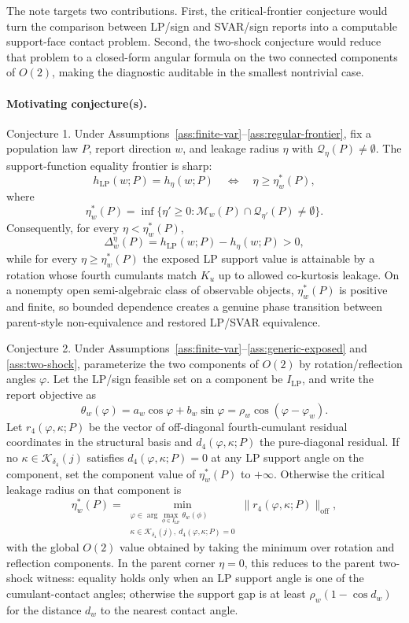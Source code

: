 \documentclass[11pt]{article}
\theoremstyle{definition}
\theoremstyle{plain}
\theoremstyle{remark}
\begin{document}
The note targets two contributions.  First, the critical-frontier conjecture would turn the comparison between LP/sign and SVAR/sign reports into a computable support-face contact problem.  Second, the two-shock conjecture would reduce that problem to a closed-form angular formula on the two connected components of \(O(2)\), making the diagnostic auditable in the smallest nontrivial case.

\paragraph{Motivating conjecture(s).}
Conjecture 1. Under Assumptions~\ref{ass:finite-var}--\ref{ass:regular-frontier}, fix a population law \(P\), report direction \(w\), and leakage radius \(\eta\) with \(\mathcal Q_\eta(P)\ne\emptyset\).  The support-function equality frontier is sharp:
\[
h_{\mathrm{LP}}(w;P)=h_\eta(w;P)
\quad\Longleftrightarrow\quad
\eta\ge \eta_w^*(P),
\]
where
\[
\eta_w^*(P)=
\inf\{\eta'\ge0:\mathcal M_w(P)\cap\mathcal Q_{\eta'}(P)\ne\emptyset\}.
\]
Consequently, for every \(\eta<\eta_w^*(P)\),
\[
\Delta_w^\eta(P)=h_{\mathrm{LP}}(w;P)-h_\eta(w;P)>0,
\]
while for every \(\eta\ge\eta_w^*(P)\) the exposed LP support value is attainable by a rotation whose fourth cumulants match \(K_u\) up to allowed co-kurtosis leakage.  On a nonempty open semi-algebraic class of observable objects, \(\eta_w^*(P)\) is positive and finite, so bounded dependence creates a genuine phase transition between parent-style non-equivalence and restored LP/SVAR equivalence.

Conjecture 2. Under Assumptions~\ref{ass:finite-var}--\ref{ass:generic-exposed} and \ref{ass:two-shock}, parameterize the two components of \(O(2)\) by rotation/reflection angles \(\varphi\).  Let the LP/sign feasible set on a component be \(I_{\mathrm{LP}}\), and write the report objective as
\[
\theta_w(\varphi)=a_w\cos\varphi+b_w\sin\varphi=\rho_w\cos(\varphi-\varphi_w).
\]
Let \(r_4(\varphi,\kappa;P)\) be the vector of off-diagonal fourth-cumulant residual coordinates in the structural basis and \(d_4(\varphi,\kappa;P)\) the pure-diagonal residual.  If no \(\kappa\in\mathcal K_{\delta_4}(j)\) satisfies \(d_4(\varphi,\kappa;P)=0\) at any LP support angle on the component, set the component value of \(\eta_w^*(P)\) to \(+\infty\).  Otherwise the critical leakage radius on that component is
\[
\eta_w^*(P)=
\min_{\substack{\varphi\in\arg\max_{\phi\in I_{\mathrm{LP}}}\theta_w(\phi)\\
\kappa\in\mathcal K_{\delta_4}(j),\ d_4(\varphi,\kappa;P)=0}}
\|r_4(\varphi,\kappa;P)\|_{\mathrm{off}},
\]
with the global \(O(2)\) value obtained by taking the minimum over rotation and reflection components.  In the parent corner \(\eta=0\), this reduces to the parent two-shock witness: equality holds only when an LP support angle is one of the cumulant-contact angles; otherwise the support gap is at least \(\rho_w(1-\cos d_w)\) for the distance \(d_w\) to the nearest contact angle.
\end{document}
